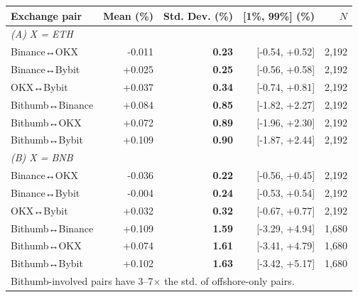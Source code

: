 \begin{tabular}{lrrrr}
\toprule
Exchange pair & Mean (\%) & Std. Dev. (\%) & [1\%, 99\%] (\%) & $N$ \\
\midrule
\multicolumn{5}{l}{\emph{(A) X = ETH}} \\
\quad Binance↔OKX & -0.011 & \textbf{0.23} & [-0.54, +0.52] & 2,192 \\
\quad Binance↔Bybit & +0.025 & \textbf{0.25} & [-0.56, +0.58] & 2,192 \\
\quad OKX↔Bybit & +0.037 & \textbf{0.34} & [-0.74, +0.81] & 2,192 \\
\quad Bithumb↔Binance & +0.084 & \textbf{0.85} & [-1.82, +2.27] & 2,192 \\
\quad Bithumb↔OKX & +0.072 & \textbf{0.89} & [-1.96, +2.30] & 2,192 \\
\quad Bithumb↔Bybit & +0.109 & \textbf{0.90} & [-1.87, +2.44] & 2,192 \\
\midrule
\multicolumn{5}{l}{\emph{(B) X = BNB}} \\
\quad Binance↔OKX & -0.036 & \textbf{0.22} & [-0.56, +0.45] & 2,192 \\
\quad Binance↔Bybit & -0.004 & \textbf{0.24} & [-0.53, +0.54] & 2,192 \\
\quad OKX↔Bybit & +0.032 & \textbf{0.32} & [-0.67, +0.77] & 2,192 \\
\quad Bithumb↔Binance & +0.109 & \textbf{1.59} & [-3.29, +4.94] & 1,680 \\
\quad Bithumb↔OKX & +0.074 & \textbf{1.61} & [-3.41, +4.79] & 1,680 \\
\quad Bithumb↔Bybit & +0.102 & \textbf{1.63} & [-3.42, +5.17] & 1,680 \\
\bottomrule
\multicolumn{5}{l}{\footnotesize Bithumb-involved pairs have 3--7$\times$ the std. of offshore-only pairs.}\\
\end{tabular}